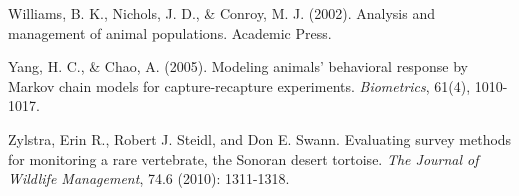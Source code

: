 \documentclass{book}
\begin{document}
\rf Williams, B. K., Nichols, J. D., \& Conroy, M. J. (2002). Analysis and management of animal populations. Academic Press.

\rf Yang, H. C., \& Chao, A. (2005). Modeling animals' behavioral response by Markov chain models for capture-recapture experiments. \textit{Biometrics}, 61(4), 1010-1017.

\rf Zylstra, Erin R., Robert J. Steidl, and Don E. Swann. Evaluating survey methods for monitoring a rare vertebrate, the Sonoran desert tortoise. \textit{The Journal of Wildlife Management}, 74.6 (2010): 1311-1318.
\end{document}
